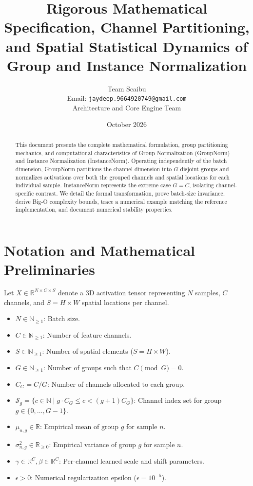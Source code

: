 \documentclass[11pt,a4paper]{article}
\title{\textbf{Rigorous Mathematical Specification, Channel Partitioning, and Spatial Statistical Dynamics of Group and Instance Normalization}}
\author{Team Scaibu \\ \small Email: \texttt{jaydeep.9664920749@gmail.com} \\ \small Architecture and Core Engine Team}
\date{October 2026}
\theoremstyle{definition}
\begin{document}
\maketitle

\begin{abstract}
This document presents the complete mathematical formulation, group partitioning mechanics, and computational characteristics of Group Normalization (GroupNorm) and Instance Normalization (InstanceNorm). Operating independently of the batch dimension, GroupNorm partitions the channel dimension into $G$ disjoint groups and normalizes activations over both the grouped channels and spatial locations for each individual sample. InstanceNorm represents the extreme case $G = C$, isolating channel-specific contrast. We detail the formal transformation, prove batch-size invariance, derive Big-O complexity bounds, trace a numerical example matching the reference implementation, and document numerical stability properties.
\end{abstract}

\section{Notation and Mathematical Preliminaries}

Let $X \in \mathbb{R}^{N \times C \times S}$ denote a 3D activation tensor representing $N$ samples, $C$ channels, and $S = H \times W$ spatial locations per channel.

\begin{itemize}
    \item $N \in \mathbb{N}_{\ge 1}$: Batch size.
    \item $C \in \mathbb{N}_{\ge 1}$: Number of feature channels.
    \item $S \in \mathbb{N}_{\ge 1}$: Number of spatial elements ($S = H \times W$).
    \item $G \in \mathbb{N}_{\ge 1}$: Number of groups such that $C \pmod G = 0$.
    \item $C_G = C/G$: Number of channels allocated to each group.
    \item $\mathcal{S}_g = \{c \in \mathbb{N} \mid g \cdot C_G \le c < (g+1) C_G\}$: Channel index set for group $g \in \{0, \dots, G-1\}$.
    \item $\mu_{n, g} \in \mathbb{R}$: Empirical mean of group $g$ for sample $n$.
    \item $\sigma_{n, g}^2 \in \mathbb{R}_{\ge 0}$: Empirical variance of group $g$ for sample $n$.
    \item $\gamma \in \mathbb{R}^C, \beta \in \mathbb{R}^C$: Per-channel learned scale and shift parameters.
    \item $\epsilon > 0$: Numerical regularization epsilon ($\epsilon = 10^{-5}$).
\end{itemize}
\end{document}
